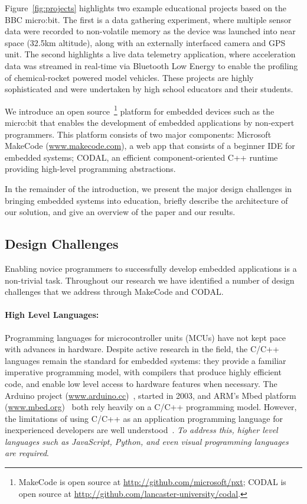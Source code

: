 Figure~\ref{fig:projects} highlights two example educational projects based on the BBC micro:bit. The first is a data gathering experiment, where multiple sensor data were recorded to non-volatile memory as the device was launched into near space (32.5km altitude), along with an externally interfaced camera and GPS unit. The second highlights a live data telemetry application, where acceleration data was streamed in real-time via Bluetooth Low Energy to enable the profiling of chemical-rocket powered model vehicles. These projects are highly sophisticated and were undertaken by high school educators and their students.

We introduce an open source~\footnote{
MakeCode is open source at \url{http://github.com/microsoft/pxt}; CODAL is open source at
\url{http://github.com/lancaster-university/codal}.} platform for embedded devices such as the micro:bit that enables the development of embedded applications by non-expert programmers. This platform consists of two major components: Microsoft MakeCode (\url{www.makecode.com}), a web app that consists of a beginner IDE for embedded
systems; CODAL, an efficient component-oriented C++ runtime 
providing high-level programming abstractions.

In the remainder of the introduction, we present the major design challenges in
bringing embedded systems into education, briefly describe the 
architecture of our solution, and give an overview of the 
paper and our results.

\subsection{Design Challenges}
\label{sec:DesignChallenges}
Enabling novice programmers to successfully develop embedded applications is a non-trivial task. Throughout our research we have identified a number of design challenges that we address through MakeCode and CODAL.

\paragraph{High Level Languages:}
Programming languages for microcontroller units (MCUs) have not kept pace with advances in hardware. Despite active research in the field, the C/C++ languages remain the standard for embedded systems: they provide a familiar imperative programming model, with compilers that produce highly efficient code, and enable low level access to hardware features when necessary. The Arduino project (\url{www.arduino.cc})~\cite{buildingArduino2014}, started in 2003, and ARM's Mbed platform (\url{www.mbed.org})~\cite{ARMmbed} both rely heavily on a C/C++ programming model. However, the limitations of using C/C++ as an application programming language for inexperienced developers are well understood~\cite{blikstein2013gears}. \emph{To address this, higher level languages such as JavaScript, Python, and even visual programming languages are required}.

